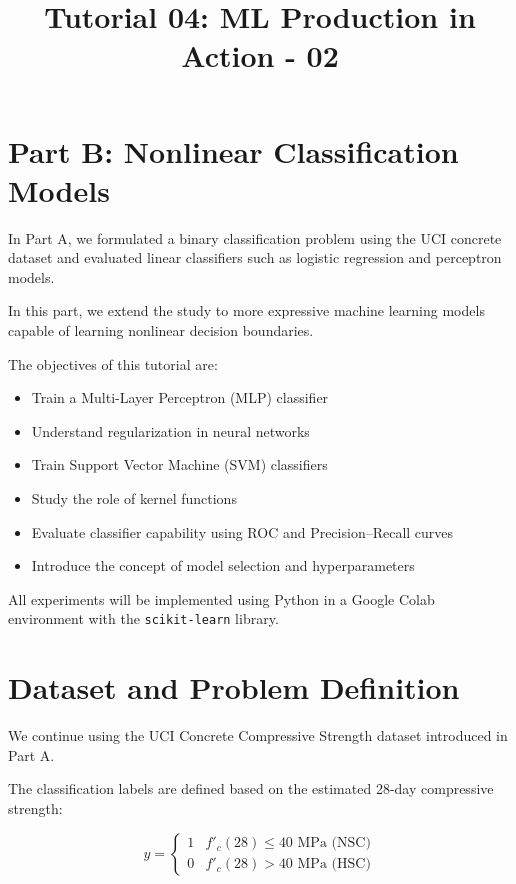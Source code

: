 \documentclass[12pt]{article}
\begin{document}
\title{Tutorial 04:  ML Production in Action - 02}
\author{}
\date{}

\maketitle

\section{Part B: Nonlinear Classification Models}

In Part A, we formulated a binary classification problem using the UCI concrete dataset and evaluated linear classifiers such as logistic regression and perceptron models.  

In this part, we extend the study to more expressive machine learning models capable of learning nonlinear decision boundaries.

The objectives of this tutorial are:

\begin{itemize}
\item Train a Multi-Layer Perceptron (MLP) classifier
\item Understand regularization in neural networks
\item Train Support Vector Machine (SVM) classifiers
\item Study the role of kernel functions
\item Evaluate classifier capability using ROC and Precision–Recall curves
\item Introduce the concept of model selection and hyperparameters
\end{itemize}

All experiments will be implemented using Python in a Google Colab environment with the \texttt{scikit-learn} library.

\section{Dataset and Problem Definition}

We continue using the UCI Concrete Compressive Strength dataset introduced in Part A.

The classification labels are defined based on the estimated 28-day compressive strength:

\[
y =
\begin{cases}
1 & f'_c(28) \le 40 \text{ MPa (NSC)} \\
0 & f'_c(28) > 40 \text{ MPa (HSC)}
\end{cases}
\]
\end{document}
